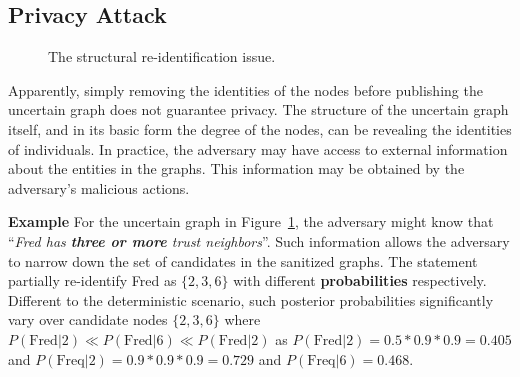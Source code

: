 \subsection{Privacy Attack}
\label{sec:AMPC}
\begin{figure}[!htb]
    \vspace{-4pt}
    \caption{The structural re-identification issue.}
    \label{fig:privacyAttack}
\end{figure} 
Apparently, simply removing the identities of the nodes before publishing the uncertain graph does not guarantee privacy.  The structure of the uncertain graph itself, and in its basic form the degree of the nodes, can be revealing the identities of individuals. 
In practice, the adversary may have access to external information about the entities in the graphs. This information may be obtained by the adversary's malicious actions. 

\textbf{Example} For the uncertain graph in Figure~\ref{fig:privacyAttack}, the adversary might know that ``\emph{Fred has \textbf{three or more} trust neighbors}''. Such information allows the adversary to narrow down the set of candidates in the sanitized graphs.  The statement partially re-identify Fred as $\lbrace 2,3,6 \rbrace$ with different \textbf{probabilities} respectively. 
Different to the deterministic scenario, such posterior probabilities significantly vary over candidate nodes $\lbrace 2,3,6 \rbrace$ where $P(\text{Fred}|2) \ll P(\text{Fred}|6) \ll P(\text{Fred}|2)$ as $P(\text{Fred}|2)=0.5*0.9*0.9=0.405$ and $P(\text{Freq}|2)=0.9*0.9*0.9=0.729$ and $P(\text{Freq}|6)=0.468$. 


